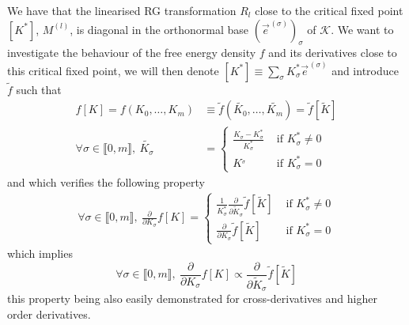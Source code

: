 \documentclass[class=report, float=false, crop=false]{standalone}
\begin{document}
We have that the linearised RG transformation $R_l$ close to the critical fixed point $[K^*]$, $M^{(l)}$, is diagonal in the orthonormal base $(\vec{e}^{\hspace{1pt}(\sigma)})_{\sigma}$ of $\mathcal{K}$. We want to investigate the behaviour of the free energy density $f$ and its derivatives close to this critical fixed point, we will then denote $[K^*]\equiv \sum_{\sigma} K^*_{\sigma}\vec{e}^{\hspace{1pt}(\sigma)}$ and introduce $\tilde{f}$ such that
\begin{equation}
\begin{aligned}
f[K]=f(K_0,\ldots,K_m)&\equiv\tilde{f}(\tilde{K_0},\ldots,\tilde{K_m})=\tilde{f}[\tilde{K}]\\
\forall \sigma \in \llbracket0,m\rrbracket,~ \tilde{K_{\sigma}} &= \begin{cases} \frac{K_{\sigma}-K_{\sigma}^*}{K_{\sigma}^*} &\text{ if } K_{\sigma}^* \neq 0 \\ K^_{\sigma} &\text{ if } K_{\sigma}^* = 0 \end{cases}
\end{aligned}
\end{equation}
and which verifies the following property
\begin{align*}
\forall \sigma \in \llbracket0,m\rrbracket,~ \frac{\partial}{\partial K_{\sigma}} f[K] = \begin{cases} \frac{1}{K_{\sigma}^*} \frac{\partial}{\partial \tilde{K}_{\sigma}} \tilde{f}[\tilde{K}] &\text{ if } K_{\sigma}^* \neq 0 \\ \frac{\partial}{\partial K_{\sigma}} \tilde{f}[\tilde{K}] &\text{ if } K_{\sigma}^* = 0 \end{cases}
\end{align*}
which implies
\begin{equation}
\forall \sigma \in \llbracket0,m\rrbracket,~ \frac{\partial}{\partial K_{\sigma}} f[K] \propto \frac{\partial}{\partial \tilde{K}_{\sigma}} \tilde{f}[\tilde{K}]
\end{equation}
this property being also easily demonstrated for cross-derivatives and higher order derivatives.\\
\end{document}
